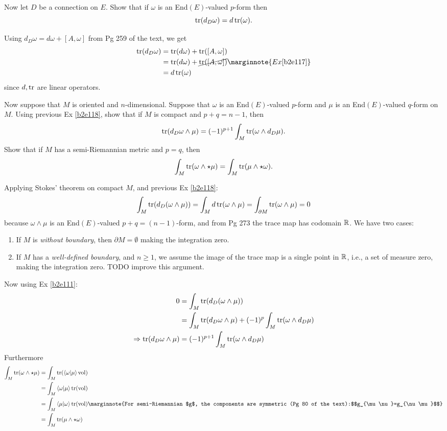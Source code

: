 \documentclass[10pt]{article}
\begin{document}
\begin{example}\label{b2e118}
	Now let $D$ be a connection on $E$. Show that if $\omega$ is an End$(E)$-valued $p$-form then
	$$
	\tr(d_D\omega) = d\tr(\omega).
	$$
\end{example}
\sol Using $d_D\omega=d\omega+[A,\omega]$ from Pg 259 of the text, we get
$$
\begin{aligned}
	\tr(d_D\omega) &= \tr(d\omega)+\tr([A,\omega])\\
	&= \tr(d\omega)+\cancel{\tr([A,\omega])}\marginnote{Ex \ref{b2e117}}\\
	&= d\tr(\omega)
\end{aligned}
$$
since $d,\tr$ are linear operators.


\begin{example}\label{b2e119}
	Now suppose that $M$ is oriented and $n$-dimensional. Suppose that $\omega$ is an End$(E)$-valued $p$-form and $\mu$ is an End$(E)$-valued $q$-form on $M$. Using previous Ex \ref{b2e118}, show that if $M$ is compact and $p+q=n-1$, then
	$$
	\tr(d_D\omega \wedge \mu) = (-1)^{p+1} \int_M\tr(\omega \wedge d_D\mu).
	$$
	Show that if $M$ has a semi-Riemannian metric and $p=q$, then
	$$
	\int_M\tr(\omega \wedge \star\mu) = \int_M\tr(\mu\wedge \star\omega).
	$$
\end{example}
\sol Applying Stokes' theorem on compact $M$, and previous Ex \ref{b2e118}:
$$
\int_M \tr(d_D(\omega\wedge\mu)) = \int_M d\tr(\omega\wedge\mu) = \int_{\partial M} \tr(\omega\wedge\mu) = 0
$$
because $\omega\wedge\mu$ is an End$(E)$-valued $p+q=(n-1)$-form, and from Pg 273 the trace map has codomain $\mathbb{R}$. We have two cases:
\begin{enumerate}
	\item If $M$ is \emph{without boundary}, then $\partial M = \emptyset$ making the integration zero.
	\item If $M$ has a \emph{well-defined boundary}, and $n \ge 1$, we assume the image of the trace map is a single point in $\mathbb{R}$, i.e., a set of measure zero, making the integration zero. TODO improve this argument.
\end{enumerate}
Now using Ex \ref{b2e111}:
$$
\begin{aligned}
	0 &= \int_M \tr(d_D(\omega\wedge\mu))\\
	&= \int_M \tr(d_D\omega\wedge\mu) + (-1)^p\int_M \tr(\omega\wedge d_D\mu)\\
	\Rightarrow \tr(d_D\omega \wedge \mu) &= (-1)^{p+1} \int_M\tr(\omega \wedge d_D\mu)
\end{aligned}$$
Furthermore
$$
\begin{aligned}
	\int_M\tr(\omega \wedge \star\mu) &= \int_M\tr(\ip{\omega}{\mu}\vol)\\
	&= \int_M\ip{\omega}{\mu}\tr(\vol)\\
	&= \int_M\ip{\mu}{\omega}\tr(\vol)\marginnote{For semi-Riemannian $g$, the components are symmetric (Pg 80 of the text):$$g_{\mu\nu}=g_{\nu\mu}$$}\\
	&= \int_M\tr(\mu\wedge \star\omega)
\end{aligned}$$
\end{document}
